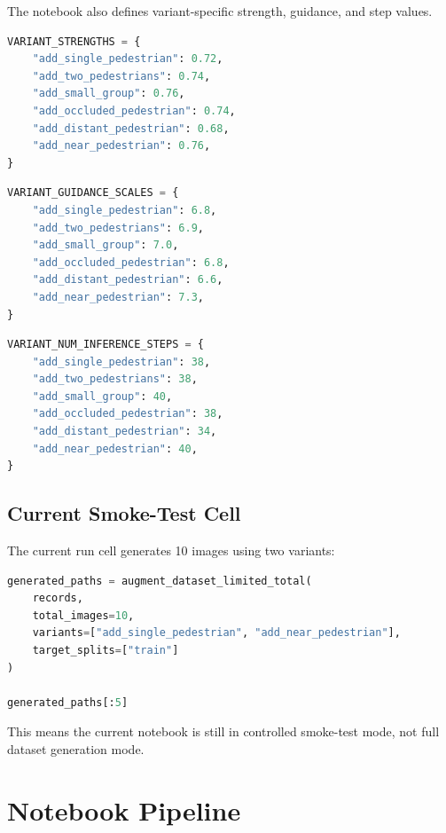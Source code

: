 \documentclass[12pt,a4paper]{article}
\begin{document}
The notebook also defines variant-specific strength, guidance, and step values.

\begin{lstlisting}[language=Python,caption={Variant-specific strength values}]
VARIANT_STRENGTHS = {
    "add_single_pedestrian": 0.72,
    "add_two_pedestrians": 0.74,
    "add_small_group": 0.76,
    "add_occluded_pedestrian": 0.74,
    "add_distant_pedestrian": 0.68,
    "add_near_pedestrian": 0.76,
}
\end{lstlisting}

\begin{lstlisting}[language=Python,caption={Variant-specific guidance values}]
VARIANT_GUIDANCE_SCALES = {
    "add_single_pedestrian": 6.8,
    "add_two_pedestrians": 6.9,
    "add_small_group": 7.0,
    "add_occluded_pedestrian": 6.8,
    "add_distant_pedestrian": 6.6,
    "add_near_pedestrian": 7.3,
}
\end{lstlisting}

\begin{lstlisting}[language=Python,caption={Variant-specific inference steps}]
VARIANT_NUM_INFERENCE_STEPS = {
    "add_single_pedestrian": 38,
    "add_two_pedestrians": 38,
    "add_small_group": 40,
    "add_occluded_pedestrian": 38,
    "add_distant_pedestrian": 34,
    "add_near_pedestrian": 40,
}
\end{lstlisting}

\subsection{Current Smoke-Test Cell}

The current run cell generates 10 images using two variants:

\begin{lstlisting}[language=Python,caption={Current smoke-test cell}]
generated_paths = augment_dataset_limited_total(
    records,
    total_images=10,
    variants=["add_single_pedestrian", "add_near_pedestrian"],
    target_splits=["train"]
)

generated_paths[:5]
\end{lstlisting}

This means the current notebook is still in controlled smoke-test mode, not full
dataset generation mode.

\section{Notebook Pipeline}
\end{document}
